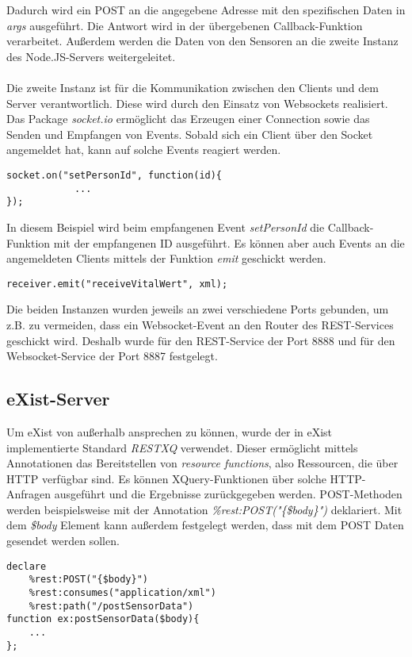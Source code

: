 Dadurch wird ein POST an die angegebene Adresse mit den spezifischen Daten in \textit{args} ausgeführt. Die Antwort wird in der übergebenen Callback-Funktion verarbeitet. Außerdem  werden die Daten von den Sensoren an die zweite Instanz des Node.JS-Servers weitergeleitet.
\\
\\
Die zweite Instanz ist für die Kommunikation zwischen den Clients und dem Server verantwortlich. Diese wird durch den Einsatz von Websockets realisiert. Das Package \textit{socket.io} ermöglicht das Erzeugen einer Connection sowie das Senden und Empfangen von Events. Sobald sich ein Client über den Socket angemeldet hat, kann auf solche Events reagiert werden.

\begin{lstlisting}
socket.on("setPersonId", function(id){
            ...
});
\end{lstlisting}

In diesem Beispiel wird beim empfangenen Event \textit{setPersonId} die Callback-Funktion mit der empfangenen ID ausgeführt. Es können aber auch Events an die angemeldeten Clients mittels der Funktion \textit{emit} geschickt werden.

\begin{lstlisting}
receiver.emit("receiveVitalWert", xml);
\end{lstlisting}

Die beiden Instanzen wurden jeweils an zwei verschiedene Ports gebunden, um z.B. zu vermeiden, dass ein Websocket-Event an den Router des REST-Services geschickt wird. Deshalb wurde für den REST-Service der Port 8888 und für den Websocket-Service der Port 8887 festgelegt.

\subsection{eXist-Server}
\label{subsec:eXistServer}
Um eXist von außerhalb ansprechen zu können, wurde der in eXist implementierte Standard \textit{RESTXQ} verwendet. Dieser ermöglicht mittels Annotationen das Bereitstellen von \textit{resource functions}, also Ressourcen, die über HTTP verfügbar sind. Es können XQuery-Funktionen über solche HTTP-Anfragen ausgeführt und die Ergebnisse zurückgegeben werden. POST-Methoden werden beispielsweise mit der Annotation \textit{\%rest:POST("\{\$body\}")} deklariert. Mit dem \textit{\$body} Element kann außerdem festgelegt werden, dass mit dem POST Daten gesendet werden sollen.

\begin{lstlisting}
declare
    %rest:POST("{$body}")
    %rest:consumes("application/xml")
    %rest:path("/postSensorData")
function ex:postSensorData($body){
    ...
};
\end{lstlisting}

